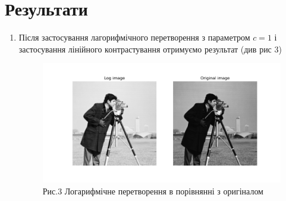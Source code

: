 \pagebreak

\section*{Результати}

\begin{enumerate}
    \item Після застосування лагорифмічного перетворення з параметром $c = 1$ і застосування 
    лінійного контрастування отримуємо результат (див рис 3)
    \begin{figure}[h]
        \includegraphics[width=\textwidth]{img_1.png}
        \caption*{Рис.3 Логарифмічне перетворення в порівнянні з оригіналом}
    \end{figure}


\end{enumerate}
